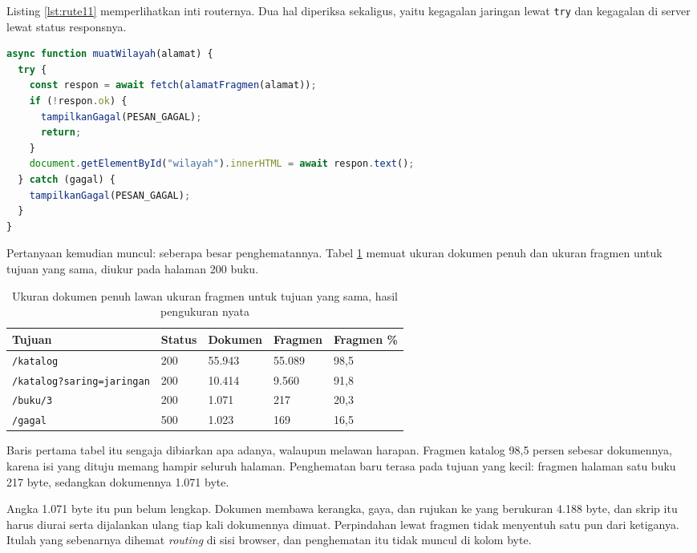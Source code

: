 Listing \ref{lst:rute11} memperlihatkan inti routernya. Dua hal diperiksa
sekaligus, yaitu kegagalan jaringan lewat \texttt{try} dan kegagalan di
server lewat status responsnya.

\begin{lstlisting}[language=TypeScript, caption={Mengambil fragmen, lalu memasangnya sebagai isi wilayah, tersedia di \berkas{sources/chapter11/statis/rute.js}}, label={lst:rute11}]
async function muatWilayah(alamat) {
  try {
    const respon = await fetch(alamatFragmen(alamat));
    if (!respon.ok) {
      tampilkanGagal(PESAN_GAGAL);
      return;
    }
    document.getElementById("wilayah").innerHTML = await respon.text();
  } catch (gagal) {
    tampilkanGagal(PESAN_GAGAL);
  }
}
\end{lstlisting}

Pertanyaan kemudian muncul: seberapa besar penghematannya. Tabel
\ref{tab:rute} memuat ukuran dokumen penuh dan ukuran fragmen untuk tujuan
yang sama, diukur pada halaman 200 buku.

\begin{table}[!htb]
  \centering
  \caption{Ukuran dokumen penuh lawan ukuran fragmen untuk tujuan yang sama,
           hasil pengukuran nyata}
  \label{tab:rute}
  \begin{tabularx}{\textwidth}{Xllll}
    \hline
    \textbf{Tujuan} & \textbf{Status} & \textbf{Dokumen} & \textbf{Fragmen} & \textbf{Fragmen \%} \\
    \hline
    \texttt{/katalog} & 200 & 55.943 & 55.089 & 98,5 \\
    \hline
    \texttt{/katalog?saring=jaringan} & 200 & 10.414 & 9.560 & 91,8 \\
    \hline
    \texttt{/buku/3} & 200 & 1.071 & 217 & 20,3 \\
    \hline
    \texttt{/gagal} & 500 & 1.023 & 169 & 16,5 \\
    \hline
  \end{tabularx}
\end{table}

Baris pertama tabel itu sengaja dibiarkan apa adanya, walaupun melawan
harapan. Fragmen katalog 98,5 persen sebesar dokumennya, karena isi yang
dituju memang hampir seluruh halaman. Penghematan baru terasa pada tujuan
yang kecil: fragmen halaman satu buku 217 byte, sedangkan dokumennya 1.071
byte.

Angka 1.071 byte itu pun belum lengkap. Dokumen membawa kerangka, gaya, dan
rujukan ke  yang berukuran 4.188 byte, dan skrip itu harus
diurai serta dijalankan ulang tiap kali dokumennya dimuat. Perpindahan lewat
fragmen tidak menyentuh satu pun dari ketiganya. Itulah yang sebenarnya
dihemat \textit{routing} di sisi browser, dan penghematan itu tidak muncul di
kolom byte.

